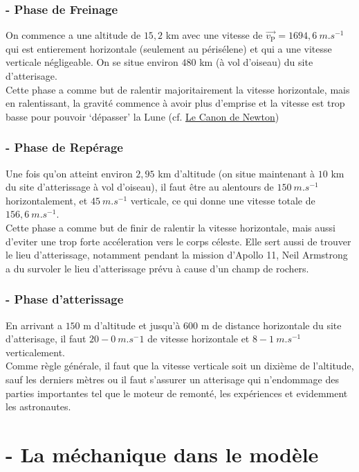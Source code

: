 \documentclass[a4paper, 12pt]{scrartcl}
\begin{document}
\subsubsection{- Phase de Freinage}
On commence a une altitude de $15,2$ km avec une vitesse de $\overrightarrow{v_{\text{P}}} = 1694,6\ \si{m.s^{-1}}$ qui est entierement horizontale (seulement au périsélene) et qui a une vitesse 
verticale négligeable. On se situe environ $480$ km (à vol d'oiseau) du site d'atterisage.
\\
Cette phase a comme but de ralentir majoritairement la vitesse horizontale, 
mais en ralentissant, la gravité commence à avoir plus d'emprise 
et la vitesse est trop basse pour pouvoir `dépasser' la Lune (cf. \href{https://fr.wikipedia.org/wiki/Canon_de_Newton}{Le Canon de Newton})

\subsubsection{- Phase de Repérage}
Une fois qu'on atteint environ $2,95$ km d'altitude (on situe maintenant à $10$ km du site d'atterissage à vol d'oiseau), il faut être au alentours de $150\ \si{m.s^{-1}}$
horizontalement, et $45\ \si{m.s^{-1}}$ verticale, ce qui donne une vitesse totale de $156,6\ \si{m.s^{-1}}$.
\\
Cette phase a comme but de finir de ralentir la vitesse horizontale, mais aussi d'eviter une trop
forte accéleration vers le corps céleste. Elle sert aussi de trouver le lieu d'atterissage, notamment pendant
la mission d'Apollo 11, Neil Armstrong a du survoler le lieu d'atterissage prévu à cause d'un
champ de rochers.

\subsubsection{- Phase d'atterissage}
En arrivant a $150$ m d'altitude et  jusqu'à $600$ m de distance horizontale du  
site d'atterisage, il faut $20-0\ \si{m.s^-1}$ de vitesse horizontale et $8-1\ \si{m.s^{-1}}$ verticalement.
\\
Comme règle générale, il faut que la vitesse verticale soit un dixième de l'altitude, sauf les derniers mètres ou il faut
s'assurer un atterisage qui n'endommage des parties importantes tel que le moteur de remonté, les expériences et evidemment les
astronautes. 



\newpage
\section{- La méchanique dans le modèle}
\end{document}
